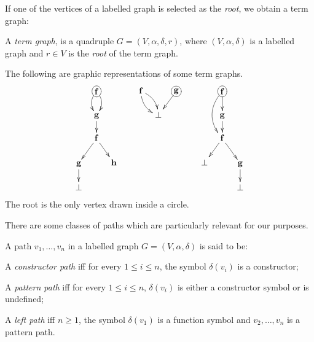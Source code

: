 \documentclass{LMCS}
\newcommand{\funone}{\mathbf{f}}
\newcommand{\funtwo}{\mathbf{g}}
\newcommand{\funthree}{\mathbf{h}}
\newcommand{\vsone}{V}
\newcommand{\ordone}{\alpha}
\newcommand{\labelone}{\delta}
\newcommand{\rootone}{r}
\newcommand{\verone}{v}
\newcommand{\tgone}{G}
\newenvironment{varitemize}
{
\begin{list}{\labelitemi}
{\setlength{\itemsep}{0.0mm}
 \setlength{\topsep}{0.0mm}
 \setlength{\parindent}{0.0mm}
 \setlength{\parskip}{0.0mm}
 \setlength{\parsep}{0.0mm}
 \setlength{\partopsep}{0.0mm}
 \setlength{\leftmargin}{15pt}
 \setlength{\labelsep}{5pt}
 \setlength{\labelwidth}{10pt}}}
{
 \end{list} 
}
\begin{document}
If one of the vertices of a labelled graph is selected as the \emph{root}, we obtain
a term graph:
\begin{defi}
A \emph{term graph}, is a quadruple 
$\tgone=(\vsone,\ordone,\labelone,\rootone)$, where 
$(\vsone,\ordone,\labelone)$ is a labelled graph and
$\rootone\in\vsone$ is the \emph{root} of the term graph.
\end{defi}
The following are graphic representations of some term graphs.
\begin{displaymath}
\xymatrix@R=15pt@C=8pt{
     &  *+[o][F]{\funone} \ar@/_/[d]\ar@/^/[d] &   \\
     & \funtwo \ar[d] &   \\
     & \funone \ar[dl]\ar[dr] &   \\
\funtwo \ar[d] &          & \funthree \\
\bot &          &   \\
}
\hspace{20pt}
\xymatrix@R=15pt@C=8pt{
 \funone\ar@/^/[dr]\ar@/_/[dr] & &  *+[o][F]{\funtwo} \ar[dl]\\
          & \bot &                         \\
}
\hspace{20pt}
\xymatrix@R=15pt@C=8pt{
     & *+[o][F]{\funone}\ar@/_1pc/[dd]\ar[d] &   \\
     & \funtwo \ar[d] &   \\
     & \funone \ar[dl]\ar[dr] &   \\
\bot &          & \funtwo\ar[d] \\
     &          & \bot  \\
}
\end{displaymath}
The root is the only vertex drawn inside a circle.

There are some classes of paths which are particularly relevant for our purposes.
\begin{defi}[Path]
A path $\verone_1,\ldots,\verone_n$ in a labelled graph
$\tgone=(\vsone,\ordone,\labelone)$ is said to be:
\begin{varitemize}
\item
  A \emph{constructor path} iff for every $1\leq i\leq n$, the symbol
  $\labelone(\verone_i)$ is a constructor;
\item
  A \emph{pattern path} iff for every $1\leq i\leq n$, 
  $\labelone(\verone_i)$ is either a constructor symbol or is undefined;
\item
  A \emph{left path} iff $n\geq 1$, the symbol $\labelone(\verone_1)$ is 
  a function symbol and $\verone_2,\ldots,\verone_n$
  is a pattern path.
\end{varitemize}
\end{defi}
\end{document}
